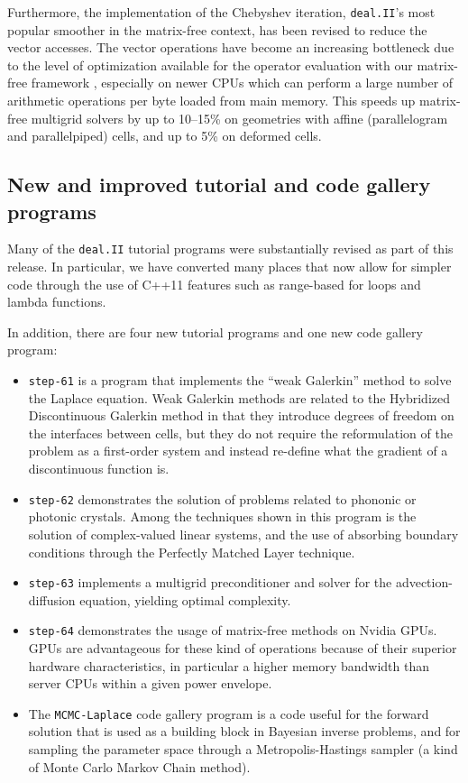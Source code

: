 \documentclass{ansarticle-preprint}
\newcommand{\specialword}[1]{\texttt{#1}}
\newcommand{\dealii}{{\specialword{deal.II}}\xspace}
\begin{document}
Furthermore, the implementation of the Chebyshev iteration, \dealii's most
popular smoother in the matrix-free context, has been revised to reduce the
vector accesses. The vector operations have become an increasing bottleneck
due to the level of optimization available for the operator evaluation with
our matrix-free framework \cite{KronbichlerKormann2019}, especially on newer
CPUs which can perform a large number of arithmetic operations per byte loaded
from main memory. This speeds up matrix-free multigrid solvers by up to
10--15\% on geometries with affine (parallelogram and parallelpiped) cells,
and up to 5\% on deformed cells.


\subsection{New and improved tutorial and code gallery programs}
\label{subsec:steps}

Many of the \dealii{} tutorial programs were substantially revised as
part of this release. In particular, we have converted many places
that now allow for simpler code through the use of C++11 features such
as range-based for loops and lambda functions.

In addition, there are four new tutorial programs and one new code
gallery program:
\begin{itemize}
\item \texttt{step-61} is a program that implements the ``weak
  Galerkin'' method to solve the Laplace equation. Weak Galerkin
  methods are related to the Hybridized Discontinuous Galerkin method
  in that they introduce degrees of freedom on the interfaces between
  cells, but they do not require the reformulation of the problem as a
  first-order system and instead re-define what the gradient of a
  discontinuous function is.

\item \texttt{step-62} demonstrates the solution of problems related
  to phononic or photonic crystals. Among the techniques shown in this
  program is the solution of complex-valued linear systems, and the
  use of absorbing boundary conditions through the Perfectly Matched
  Layer technique.

\item \texttt{step-63} implements a multigrid preconditioner
  and solver for the advection-diffusion equation, yielding optimal
  complexity.

\item \texttt{step-64} demonstrates the usage of matrix-free methods on Nvidia GPUs.
GPUs are advantageous for these kind of operations because of their superior
hardware characteristics, in particular a higher memory bandwidth than server
CPUs within a given power envelope.

\item The \texttt{MCMC-Laplace} code gallery program is a code useful
  for the forward solution that is used as a building block in
  Bayesian inverse problems, and for sampling the parameter space
  through a Metropolis-Hastings sampler (a kind of Monte Carlo
  Markov Chain method).
\end{itemize}
\end{document}
